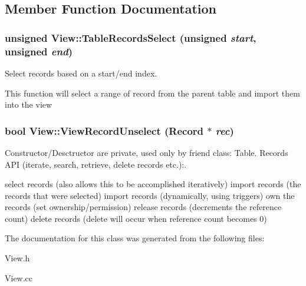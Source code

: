 \subsection{Member Function Documentation}
\subsubsection{\setlength{\rightskip}{0pt plus 5cm}unsigned View::Table\-Records\-Select (unsigned {\em start}, unsigned {\em end})}\label{classView_a1}


Select records based on a start/end index. 

This function will select a range of record from the parent table and import them into the view 
\subsubsection{\setlength{\rightskip}{0pt plus 5cm}bool View::View\-Record\-Unselect (Record $\ast$ {\em rec})}\label{classView_a0}


Constructor/Desctructor are private, used only by friend class: Table. Records API (iterate, search, retrieve, delete records etc.):. 

select records (also allows this to be accomplished iteratively) import records (the records that were selected) import records (dynamically, using triggers) own the records (set ownership/permission) release records (decrements the reference count) delete records (delete will occur when reference count becomes 0) 

The documentation for this class was generated from the following files:\begin{CompactItemize}
\item 
View.h\item 
View.cc\end{CompactItemize}

